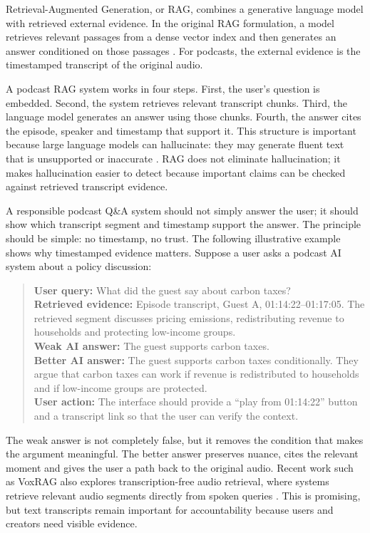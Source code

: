 \documentclass[11pt,a4paper]{article}
\begin{document}
Retrieval-Augmented Generation, or RAG, combines a generative language model with retrieved external evidence. In the original RAG formulation, a model retrieves relevant passages from a dense vector index and then generates an answer conditioned on those passages \cite{Lewis2020RAG}. For podcasts, the external evidence is the timestamped transcript of the original audio.

A podcast RAG system works in four steps. First, the user's question is embedded. Second, the system retrieves relevant transcript chunks. Third, the language model generates an answer using those chunks. Fourth, the answer cites the episode, speaker and timestamp that support it. This structure is important because large language models can hallucinate: they may generate fluent text that is unsupported or inaccurate \cite{Huang2025Hallucination}. RAG does not eliminate hallucination; it makes hallucination easier to detect because important claims can be checked against retrieved transcript evidence.


A responsible podcast Q\&A system should not simply answer the user; it should show which transcript segment and timestamp support the answer. The principle should be simple: no timestamp, no trust. The following illustrative example shows why timestamped evidence matters. Suppose a user asks a podcast AI system about a policy discussion:

\begin{quote}
\textbf{User query:} What did the guest say about carbon taxes?\\[0.3em]
\textbf{Retrieved evidence:} Episode transcript, Guest A, 01:14:22--01:17:05. The retrieved segment discusses pricing emissions, redistributing revenue to households and protecting low-income groups.\\[0.3em]
\textbf{Weak AI answer:} The guest supports carbon taxes.\\[0.3em]
\textbf{Better AI answer:} The guest supports carbon taxes conditionally. They argue that carbon taxes can work if revenue is redistributed to households and if low-income groups are protected.\\[0.3em]
\textbf{User action:} The interface should provide a ``play from 01:14:22'' button and a transcript link so that the user can verify the context.
\end{quote}

The weak answer is not completely false, but it removes the condition that makes the argument meaningful. The better answer preserves nuance, cites the relevant moment and gives the user a path back to the original audio. Recent work such as VoxRAG also explores transcription-free audio retrieval, where systems retrieve relevant audio segments directly from spoken queries \cite{VoxRAG2025}. This is promising, but text transcripts remain important for accountability because users and creators need visible evidence.
\end{document}
